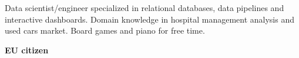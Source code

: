 

\begin{cvparagraph}
\begin{minipage}[t]{0.3\textwidth} %
Data scientist/engineer specialized in relational databases, data pipelines and
interactive dashboards. Domain knowledge in hospital management analysis and
used cars market. Board games and piano for free time.

\medskip
\textbf{EU citizen}

\end{minipage}
\hfill
\begin{minipage}[t]{0.6\textwidth} %

\end{minipage}
\end{cvparagraph}

